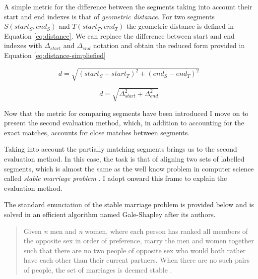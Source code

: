     
    A simple metric for the difference between the segments taking into account their start and end indexes is that of \textit{geometric distance}. For two segments $S(start_S,end_S)$ and $T(start_T,end_T)$ the geometric distance is defined in Equation \ref{eq:distance}. We can replace the difference between start and end indexes with $\varDelta_{start}$ and $\varDelta_{end}$ notation and obtain the reduced form provided in Equation \ref{eq:distance-simpliefied}
    
    \begin{equation} \label{eq:distance}
    d= \sqrt{(start_S - start_T)^{2}+(end_S-end_T)^{2}}
    \end{equation}
    
    \begin{equation} \label{eq:distance-simpliefied}
    d= \sqrt{\varDelta_{start} ^{2}+\varDelta_{end}^{2}}
    \end{equation}

    Now that the metric for comparing segments have been introduced I move on to present the second evaluation method, which, in addition to accounting for the exact matches, accounts for close matches between segments. 
    
    Taking into account the partially matching segments brings us to the second evaluation method. In this case, the task is that of aligning two sets of labelled segments, which is almost the same as the well know problem in computer science called \textit{stable marriage problem} \citep{Gusfield1989}. I adopt onward this frame to explain the evaluation method.
    
    The standard enunciation of the stable marriage problem is provided below and is solved in an efficient algorithm named Gale-Shapley \citep{Gale1962} after its authors.
    
    \begin{quotation}
        Given \textit{n} men and \textit{n} women, where each person has ranked all members of the opposite sex in order of preference, marry the men and women together such that there are no two people of opposite sex who would both rather have each other than their current partners. When there are no such pairs of people, the set of marriages is deemed stable \citet{iwama2008}.
    \end{quotation}

